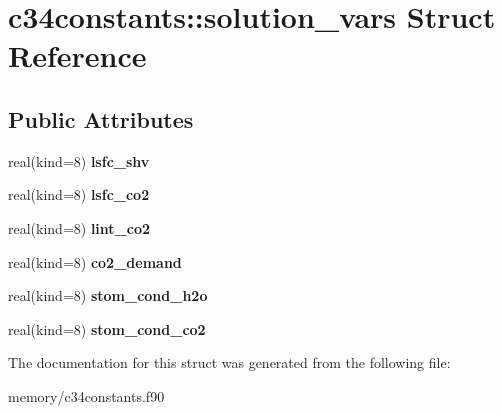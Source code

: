 \hypertarget{structc34constants_1_1solution__vars}{
\section{c34constants::solution\_\-vars Struct Reference}
\label{structc34constants_1_1solution__vars}
}
\subsection*{Public Attributes}
\begin{DoxyCompactItemize}
\item 
\hypertarget{structc34constants_1_1solution__vars_a0df579a15ba37cb260c02e5e5006a898}{
real(kind=8) {\bfseries lsfc\_\-shv}}
\label{structc34constants_1_1solution__vars_a0df579a15ba37cb260c02e5e5006a898}

\item 
\hypertarget{structc34constants_1_1solution__vars_ac883ed09e84e928780493e4964a66a7c}{
real(kind=8) {\bfseries lsfc\_\-co2}}
\label{structc34constants_1_1solution__vars_ac883ed09e84e928780493e4964a66a7c}

\item 
\hypertarget{structc34constants_1_1solution__vars_a02f4a98ac3084ca6df1289a9c5d98b5f}{
real(kind=8) {\bfseries lint\_\-co2}}
\label{structc34constants_1_1solution__vars_a02f4a98ac3084ca6df1289a9c5d98b5f}

\item 
\hypertarget{structc34constants_1_1solution__vars_a76ff465202bc6670a65318d765d34a29}{
real(kind=8) {\bfseries co2\_\-demand}}
\label{structc34constants_1_1solution__vars_a76ff465202bc6670a65318d765d34a29}

\item 
\hypertarget{structc34constants_1_1solution__vars_af8670de0f15d89016b814037183ece8e}{
real(kind=8) {\bfseries stom\_\-cond\_\-h2o}}
\label{structc34constants_1_1solution__vars_af8670de0f15d89016b814037183ece8e}

\item 
\hypertarget{structc34constants_1_1solution__vars_a0ff64b64e4fcc1416cb87b47a096d7a1}{
real(kind=8) {\bfseries stom\_\-cond\_\-co2}}
\label{structc34constants_1_1solution__vars_a0ff64b64e4fcc1416cb87b47a096d7a1}

\end{DoxyCompactItemize}


The documentation for this struct was generated from the following file:\begin{DoxyCompactItemize}
\item 
memory/c34constants.f90\end{DoxyCompactItemize}
